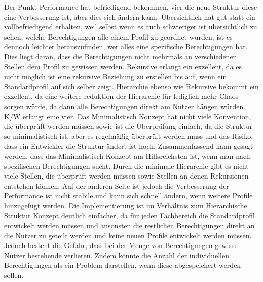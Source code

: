 Der Punkt Performance hat befriedigend bekommen, vier die neue Struktur diese eine Verbesserung ist, aber dies sich ändern kann.
Übersichtlich hat gut statt ein vollbefriedigend erhalten, weil selbst wenn es auch schwieriger ist übersichtlich zu sehen, welche Berechtigungen alle einem Profil zu geordnet wurden, ist es dennoch leichter herauszufinden, wer alles eine spezifische Berechtigungen hat.
Dies liegt daran, dass die Berechtigungen nicht mehrmals an verschiedenen Stellen dem Profil zu gewissen werden.
Rekursive erlangt ein exzellent, da es nicht möglich ist eine rekursive Beziehung zu erstellen bis auf, wenn ein Standardprofil auf sich selber zeigt.
Hierarchie ebenso wie Rekursive bekommt ein exzellent, da eine weitere reduktion der Hierarchie für lediglich mehr Chaos sorgen würde, da dann alle Berechtigungen direkt am Nutzer hängen würden.
\ac{K/W} erlangt eine vier. 
Das Minimalistisch Konzept hat nicht viele Konvention, die überprüft werden müssen sowie ist die Überprüfung einfach, da die Struktur so minimalistisch ist, aber es regelmäßig überprüft werden muss und das Risiko, dass ein Entwickler die Struktur ändert ist hoch.
\newline
\newline
Zusammenfassend kann gesagt werden, dass das Minimalistisch Konzept am Hilfsreichsten ist, wenn man nach spezifischen Berechtigungen sucht.
Durch die minimale Hierarchie gibt es nicht viele Stellen, die überprüft werden müssen sowie Stellen an denen Rekursionen entstehen können.
Auf der anderen Seite ist jedoch die Verbesserung der Performance ist nicht stabile und kann sich schnell ändern, wenn weitere Profile hinzugefügt werden.
Die Implementierung ist im Verhältnis zum Hierarchische Struktur Konzept deutlich einfacher, da für jeden Fachbereich die Standardprofil entwickelt werden müssen und ansonsten die restlichen Berechtigungen direkt an die Nutzer zu geteilt werden und keine neuen Profile entwickelt werden müssen.
Jedoch besteht die Gefahr, dass bei der Menge von Berechtigungen gewisse Nutzer bestehende verlieren.
Zudem könnte die Anzahl der individuellen Berechtigungen als ein Problem darstellen, wenn diese abgespeichert werden sollen.

